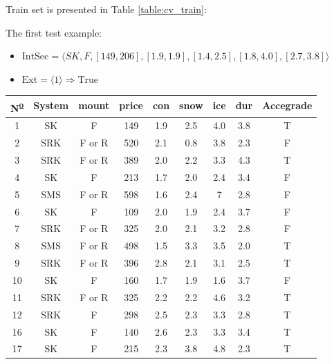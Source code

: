 \documentclass[12pt]{report}
\begin{document}
\begin{solution}
\begin{enumerate}
\begin{table}[H]
        \end{table}
    Train set is presented in Table \ref{table:cv_train}:
    \par 
    The first test example:
    \begin{itemize}
      \item $\text{IntSec} = \langle SK, F, [ 149, 206], [1.9, 1.9], [1.4, 2.5], [1.8, 4.0], [2.7, 3.8] \rangle$
      \item $\text{Ext} = \langle 1 \rangle \Longrightarrow \text{True}$
    \end{itemize}
    \begin{table}[H]
      \centering
      \begin{tabular}{|c|c|c|c|c|c|c|c|c|}
      \hline
      N\textsuperscript{\underline{o}} & System & mount  & price & con & snow & ice & dur & Accegrade \\ \hline
      1  & SK     & F      & 149   & 1.9 & 2.5  & 4.0 & 3.8 & T         \\ \hline
      2  & SRK    & F or R & 520   & 2.1 & 0.8  & 3.8 & 2.3 & F         \\ \hline
      3  & SRK    & F or R & 389   & 2.0 & 2.2  & 3.3 & 4.3 & T         \\ \hline
      4  & SK     & F      & 213   & 1.7 & 2.0  & 2.4 & 3.4 & F         \\ \hline
      5  & SMS    & F or R & 598   & 1.6 & 2.4  & 7   & 2.8 & F         \\ \hline
      6  & SK     & F      & 109   & 2.0 & 1.9  & 2.4 & 3.7 & F         \\ \hline
      7  & SRK    & F or R & 325   & 2.0 & 2.1  & 3.2 & 2.8 & F         \\ \hline
      8  & SMS    & F or R & 498   & 1.5 & 3.3  & 3.5 & 2.0 & T         \\ \hline
      9  & SRK    & F or R & 396   & 2.8 & 2.1  & 3.1 & 2.5 & T         \\ \hline
      10 & SK     & F      & 160   & 1.7 & 1.9  & 1.6 & 3.7 & F         \\ \hline
      11 & SRK    & F or R & 325   & 2.2 & 2.2  & 4.6 & 3.2 & T         \\ \hline
      12 & SRK    & F      & 298   & 2.5 & 2.3  & 3.3 & 2.8 & T         \\ \hline
      16 & SK     & F      & 140   & 2.6 & 2.3  & 3.3 & 3.4 & T         \\ \hline
      17 & SK     & F      & 215   & 2.3 & 3.8  & 4.8 & 2.3 & T         \\ \hline

\end{tabular}
\end{table}
\end{enumerate}
\end{solution}
\end{document}

